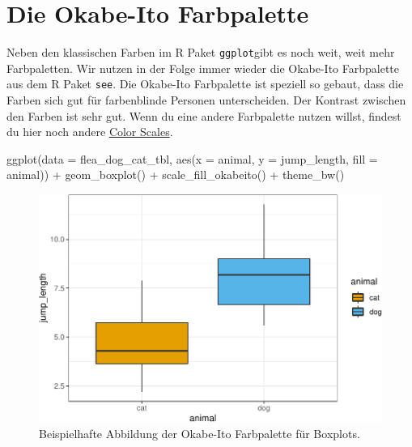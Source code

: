 \documentclass[
  letterpaper,
]{scrbook}
\newenvironment{Shaded}{\begin{snugshade}}{\end{snugshade}}
\newcommand{\AttributeTok}[1]{\textcolor[rgb]{0.40,0.45,0.13}{#1}}
\newcommand{\FunctionTok}[1]{\textcolor[rgb]{0.28,0.35,0.67}{#1}}
\newcommand{\NormalTok}[1]{\textcolor[rgb]{0.00,0.23,0.31}{#1}}
\newcommand{\SpecialCharTok}[1]{\textcolor[rgb]{0.37,0.37,0.37}{#1}}
\begin{document}
\hypertarget{die-okabe-ito-farbpalette}{%
\section{Die Okabe-Ito Farbpalette}\label{die-okabe-ito-farbpalette}}


Neben den klassischen Farben im R Paket \texttt{ggplot}gibt es noch
weit, weit mehr Farbpaletten. Wir nutzen in der Folge immer wieder die
Okabe-Ito Farbpalette aus dem R Paket \texttt{see}. Die Okabe-Ito
Farbpalette ist speziell so gebaut, dass die Farben sich gut für
farbenblinde Personen unterscheiden. Der Kontrast zwischen den Farben
ist sehr gut. Wenn du eine andere Farbpalette nutzen willst, findest du
hier noch andere
\href{https://easystats.github.io/see/articles/seecolorscales.html}{Color
Scales}.

\begin{Shaded}
\begin{Highlighting}[]
\FunctionTok{ggplot}\NormalTok{(}\AttributeTok{data =}\NormalTok{ flea\_dog\_cat\_tbl, }
       \FunctionTok{aes}\NormalTok{(}\AttributeTok{x =}\NormalTok{ animal, }\AttributeTok{y =}\NormalTok{ jump\_length,}
           \AttributeTok{fill =}\NormalTok{ animal)) }\SpecialCharTok{+}
  \FunctionTok{geom\_boxplot}\NormalTok{() }\SpecialCharTok{+}
  \FunctionTok{scale\_fill\_okabeito}\NormalTok{() }\SpecialCharTok{+}
  \FunctionTok{theme\_bw}\NormalTok{()}
\end{Highlighting}
\end{Shaded}

\begin{figure}[H]

{\centering \includegraphics{./eda-ggplot_files/figure-pdf/fig-labels-see-0-1.pdf}

}

\caption{\label{fig-labels-see-0}Beispielhafte Abbildung der Okabe-Ito
Farbpalette für Boxplots.}

\end{figure}
\end{document}
